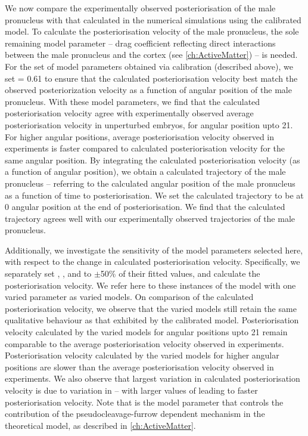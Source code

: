 We now compare the experimentally observed posteriorisation of the male pronucleus with that calculated in the numerical simulations using the calibrated model. To calculate the posteriorisation velocity of the male pronucleus, the sole remaining model parameter -- drag coefficient \dragCoefficient reflecting direct interactions between the male pronucleus and the cortex (see \autoref{ch:ActiveMatter}) --  is needed. For the set of model parameters obtained via calibration (described above), we set \dragCoefficient = \num{0.61} to ensure that the calculated posteriorisation velocity best match the observed posteriorization velocity as a function of angular position of the male pronucleus. With these model parameters, we find that the calculated posteriorisation velocity agree with experimentally observed average posteriorisation velocity in unperturbed embryos, for angular position upto \SI{21}{\unitAngle}. For higher angular positions, average posteriorisation velocity observed in experiments is faster compared to calculated posteriorisation velocity for the same angular position. By integrating the calculated posteriorisation velocity (as a function of angular position), we obtain a calculated trajectory of the male pronucleus -- referring to the calculated angular position of the male pronucleus as a function of time to posteriorisation. We set the calculated trajectory to be at \SI{0}{\unitAngle} angular position at the end of posteriorisation. We find that the calculated trajectory agrees well with our experimentally observed trajectories of the male pronucleus. 

Additionally, we investigate the sensitivity of the model parameters selected here, with respect to the change in calculated posteriorisation velocity. Specifically, we separately set \hydrodynamicLength, \nematicLength, \activeRelaxLength and \dragCoefficient to $\pm$\num{50}\% of their fitted values, and calculate the posteriorisation velocity. We refer here to these instances of the model with one varied parameter as varied models. On comparison of the calculated posteriorisation velocity, we observe that the varied models still retain the same qualitative behaviour as that exhibited by the calibrated model. Posteriorisation velocity calculated by the varied models for angular positions upto \SI{21}{\unitAngle} remain comparable to the average posteriorisation velocity observed in experiments. Posteriorisation velocity calculated by the varied models for higher angular positions are slower than the average posteriorisation velocity observed in experiments. We also observe that largest variation in calculated posteriorisation velocity is due to variation in \nematicLength -- with larger values of \nematicLength leading to faster posteriorisation velocity. Note that \nematicLength is the model parameter that controls the contribution of the pseudocleavage-furrow dependent mechanism in the theoretical model, as described in \autoref{ch:ActiveMatter}.


